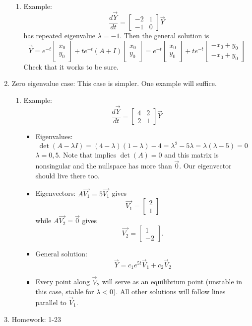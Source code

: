 \documentclass{article}
\begin{document}
\begin{enumerate}
\begin{enumerate}
\item Example: 
\[
\frac{d\vec{Y}}{dt} = 
\begin{bmatrix}
-2 & 1 \\
-1 & 0
\end{bmatrix} \vec{Y}
\]
has repeated eigenvalue $\lambda = -1$. Then the general solution is
\[
\vec{Y} = e^{-t} \begin{bmatrix}
x_0 \\ y_0
\end{bmatrix}
+ t e^{-t} (A+I) \begin{bmatrix}
x_0 \\ y_0
\end{bmatrix}
= e^{-t} \begin{bmatrix}
x_0 \\ y_0
\end{bmatrix}
+ t e^{-t} \begin{bmatrix}
-x_0+y_0 \\ -x_0+y_0
\end{bmatrix}
\]
Check that it works to be sure.
\end{enumerate}

\item Zero eigenvalue case: This case is simpler. One example will suffice.
\begin{enumerate}
\item Example:
\[
\frac{d\vec{Y}}{dt} = \begin{bmatrix}
4 & 2 \\
2 & 1
\end{bmatrix} \vec{Y}
\]
\begin{itemize}
\item Eigenvalues:
\[
\det(A-\lambda I) = (4-\lambda)(1-\lambda)-4 = \lambda^2-5\lambda = \lambda(\lambda-5)=0
\]
$\lambda = 0,5$. Note that implies $\det(A)=0$ and this matrix is nonsingular and the nullspace has more than $\vec{0}$. Our eigenvector should live there too. 
\item Eigenvectors: $A\vec{V_1} = 5 \vec{V_1}$ gives
\[
\vec{V_1} = \begin{bmatrix}
2 \\ 1
\end{bmatrix}
\]
while
$A\vec{V_2} = \vec{0}$ gives
\[
\vec{V_2} = \begin{bmatrix}
1 \\ -2
\end{bmatrix}.
\]
\item General solution:
\[
\vec{Y} = c_1 e^{5t} \vec{V}_1 + c_2 \vec{V}_2
\]
\item Every point along $\vec{V}_2$ will serve as an equilibrium point (unstable in this case, stable for $\lambda<0$). All other solutions will follow lines parallel to $\vec{V}_1$.
\end{itemize}
\end{enumerate}

\item Homework: 1-23

\end{enumerate}
\end{document}
